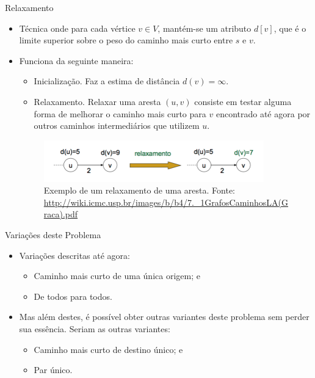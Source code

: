 \documentclass{beamer}
\begin{document}
\begin{frame}{Relaxamento \cite{cormen2002algoritmos}}
	\begin{itemize}
		\item Técnica onde para cada vértice $v \in V$, mantém-se um atributo $d[v]$, que é o limite superior sobre o peso do caminho mais curto entre $s$ e $v$. 
		
		\item Funciona da seguinte maneira:
		\begin{itemize}
			\item Inicialização. Faz a estima de distância  $d(v)=\infty$.
			
			\item Relaxamento. Relaxar uma aresta $(u,v)$ consiste em testar alguma forma de melhorar o caminho mais curto para $v$ encontrado até agora por outros caminhos intermediários que utilizem $u$. 
		\end{itemize}
		
		\begin{figure}[H]
			\centering
			\includegraphics[width=0.9\textwidth]{img/relaxamento.png}
			\caption{Exemplo de um relaxamento de uma aresta. Fonte: \protect\url{http://wiki.icmc.usp.br/images/b/b4/7._1GrafosCaminhosLA(Graca).pdf}}
			\label{fig:relaxamento}
		\end{figure}
	\end{itemize}
\end{frame}

\begin{frame}{Variações deste Problema}
	\begin{itemize}
		\item Variações descritas até agora: 
		\begin{itemize}
			\item Caminho mais curto de uma única origem; e \pause
			\item De todos para todos.
		\end{itemize}
		
		\pause
		
		\item Mas além destes, é possível obter outras variantes deste problema sem perder sua essência. Seriam as outras variantes: 
		\begin{itemize}
			\item Caminho mais curto de destino único; e 
			\item Par único.
		\end{itemize}
	\end{itemize}
\end{frame}
\end{document}
